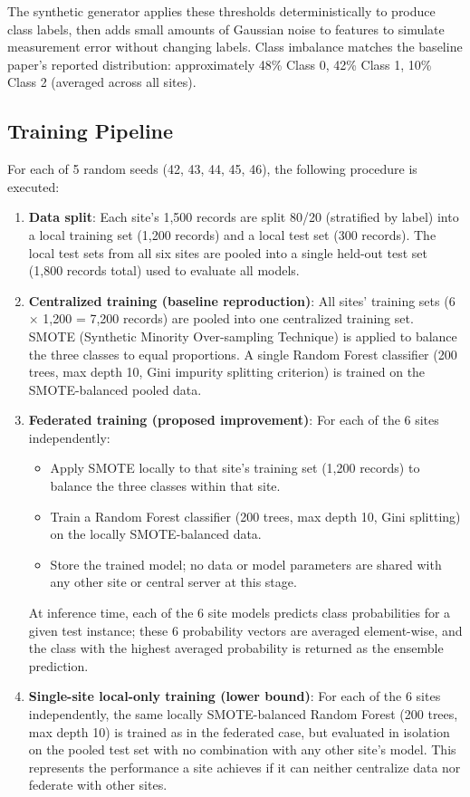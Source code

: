 The synthetic generator applies these thresholds deterministically to produce class labels, then adds small amounts of Gaussian noise to features to simulate measurement error without changing labels. Class imbalance matches the baseline paper's reported distribution: approximately 48\% Class 0, 42\% Class 1, 10\% Class 2 (averaged across all sites).

\subsection{Training Pipeline}
\label{subsec:training}

For each of 5 random seeds (42, 43, 44, 45, 46), the following procedure is executed:

\begin{enumerate}
  \item \textbf{Data split}: Each site's 1,500 records are split 80/20 (stratified by label) into a local training set (1,200 records) and a local test set (300 records). The local test sets from all six sites are pooled into a single held-out test set (1,800 records total) used to evaluate all models.
  
  \item \textbf{Centralized training (baseline reproduction)}: All sites' training sets (6 $\times$ 1,200 = 7,200 records) are pooled into one centralized training set. SMOTE (Synthetic Minority Over-sampling Technique) is applied to balance the three classes to equal proportions. A single Random Forest classifier (200 trees, max depth 10, Gini impurity splitting criterion) is trained on the SMOTE-balanced pooled data.
  
  \item \textbf{Federated training (proposed improvement)}: For each of the 6 sites independently:
  \begin{itemize}
    \item Apply SMOTE locally to that site's training set (1,200 records) to balance the three classes within that site.
    \item Train a Random Forest classifier (200 trees, max depth 10, Gini splitting) on the locally SMOTE-balanced data.
    \item Store the trained model; no data or model parameters are shared with any other site or central server at this stage.
  \end{itemize}
  At inference time, each of the 6 site models predicts class probabilities for a given test instance; these 6 probability vectors are averaged element-wise, and the class with the highest averaged probability is returned as the ensemble prediction.
  
  \item \textbf{Single-site local-only training (lower bound)}: For each of the 6 sites independently, the same locally SMOTE-balanced Random Forest (200 trees, max depth 10) is trained as in the federated case, but evaluated in isolation on the pooled test set with no combination with any other site's model. This represents the performance a site achieves if it can neither centralize data nor federate with other sites.
\end{enumerate}

